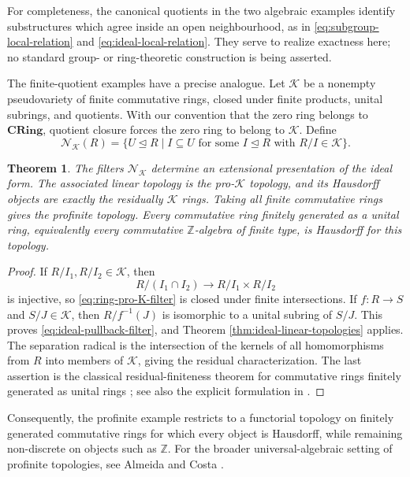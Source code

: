 \documentclass[12pt,oneside,reqno]{amsart}
\newtheorem{theorem}{Theorem}[section]
\theoremstyle{definition}
\theoremstyle{remark}
\newcommand{\CRing}{\mathbf{CRing}}
\begin{document}
For completeness, the canonical quotients in the two algebraic
examples identify substructures which agree inside an open
neighbourhood, as in \eqref{eq:subgroup-local-relation} and
\eqref{eq:ideal-local-relation}.  They serve to realize exactness here;
no standard group- or ring-theoretic construction is being asserted.

The finite-quotient examples have a precise analogue.  Let
\(\mathcal K\) be a nonempty pseudovariety of finite commutative rings,
closed under finite products, unital subrings, and quotients.  With our
convention that the zero ring belongs to \(\CRing\), quotient closure
forces the zero ring to belong to \(\mathcal K\).  Define
\begin{equation}\label{eq:ring-pro-K-filter}
 \mathcal N_{\mathcal K}(R)=
 \{U\trianglelefteq R\mid
   I\subseteq U\text{ for some }I\trianglelefteq R
   \text{ with }R/I\in\mathcal K\}.
\end{equation}

\begin{theorem}\label{thm:ring-pro-K-topology}
The filters \(\mathcal N_{\mathcal K}\) determine an extensional
presentation of the ideal form.  The associated linear topology is the
pro-\(\mathcal K\) topology, and its Hausdorff objects are exactly the
residually \(\mathcal K\) rings.  Taking all finite commutative rings
gives the profinite topology.  Every commutative ring finitely
generated as a unital ring, equivalently every commutative
\(\mathbb Z\)-algebra of finite type, is Hausdorff for this topology.
\end{theorem}

\begin{proof}
If \(R/I_1,R/I_2\in\mathcal K\), then
\[
 R/(I_1\cap I_2)\longrightarrow R/I_1\times R/I_2
\]
is injective, so \eqref{eq:ring-pro-K-filter} is closed under finite
intersections.  If \(f:R\to S\) and \(S/J\in\mathcal K\), then
\(R/f^{-1}(J)\) is isomorphic to a unital subring of \(S/J\).
This proves \eqref{eq:ideal-pullback-filter}, and Theorem
\ref{thm:ideal-linear-topologies} applies.  The separation radical is
the intersection of the kernels of all homomorphisms from \(R\) into
members of \(\mathcal K\), giving the residual characterization.  The
last assertion is the classical residual-finiteness theorem for
commutative rings finitely generated as unital rings
\cite{OrzechRibes}; see also the explicit formulation in
\cite[Lemma~2.1]{BellDanchev}.
\end{proof}

Consequently, the profinite example restricts to a functorial topology
on finitely generated commutative rings for which every object is
Hausdorff, while remaining non-discrete on objects such as
\(\mathbb Z\).  For the broader universal-algebraic setting of
profinite topologies, see Almeida and Costa \cite{AlmeidaCosta}.
\end{document}
